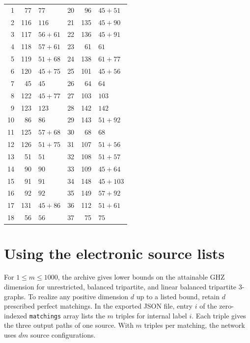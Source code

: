 \documentclass[10pt]{article}
\numberwithin{equation}{section}
\begin{document}
\begin{center}
\begin{minipage}[t]{0.485\linewidth}
\begin{tabular}{@{}rrl@{\hspace{0.65em}}rrl@{}}
1 & 77 & $77$ & 20 & 96 & $45+51$\\
2 & 116 & $116$ & 21 & 135 & $45+90$\\
3 & 117 & $56+61$ & 22 & 136 & $45+91$\\
4 & 118 & $57+61$ & 23 & 61 & $61$\\
5 & 119 & $51+68$ & 24 & 138 & $61+77$\\
6 & 120 & $45+75$ & 25 & 101 & $45+56$\\
7 & 45 & $45$ & 26 & 64 & $64$\\
8 & 122 & $45+77$ & 27 & 103 & $103$\\
9 & 123 & $123$ & 28 & 142 & $142$\\
10 & 86 & $86$ & 29 & 143 & $51+92$\\
11 & 125 & $57+68$ & 30 & 68 & $68$\\
12 & 126 & $51+75$ & 31 & 107 & $51+56$\\
13 & 51 & $51$ & 32 & 108 & $51+57$\\
14 & 90 & $90$ & 33 & 109 & $45+64$\\
15 & 91 & $91$ & 34 & 148 & $45+103$\\
16 & 92 & $92$ & 35 & 149 & $57+92$\\
17 & 131 & $45+86$ & 36 & 112 & $51+61$\\
18 & 56 & $56$ & 37 & 75 & $75$\\
\bottomrule
\end{tabular}
\end{minipage}
\end{center}
\endgroup

\section{Using the electronic source lists}

For $1\le m\le1000$, the archive gives lower bounds on the attainable GHZ dimension for unrestricted, balanced tripartite, and linear balanced tripartite $3$-graphs. To realize any positive dimension $d$ up to a listed bound, retain $d$ prescribed perfect matchings. In the exported JSON file, entry $i$ of the zero-indexed \texttt{matchings} array lists the $m$ triples for internal label $i$. Each triple gives the three output paths of one source. With $m$ triples per matching, the network uses $dm$ source configurations.
\end{document}
